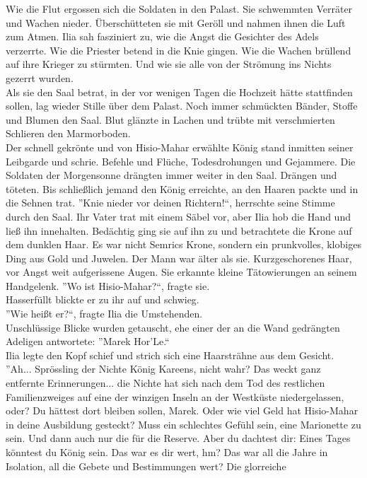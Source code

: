 Wie die Flut ergossen sich die Soldaten in den Palast. Sie schwemmten Verräter und Wachen nieder. 
Überschütteten sie mit Geröll und nahmen ihnen die Luft zum Atmen. Ilia sah fasziniert zu, wie die 
Angst die Gesichter des Adels verzerrte. Wie die Priester betend in die Knie gingen. Wie die Wachen 
brüllend auf ihre Krieger zu stürmten. Und wie sie alle von der Strömung ins Nichts gezerrt 
wurden.\\
Als sie den Saal betrat, in der vor wenigen Tagen die Hochzeit hätte stattfinden sollen, lag wieder 
Stille über dem Palast. Noch immer schmückten Bänder, Stoffe und Blumen den Saal. Blut glänzte in 
Lachen und trübte mit verschmierten Schlieren den Marmorboden.\\
Der schnell gekrönte und von Hisio-Mahar erwählte König stand inmitten seiner Leibgarde und 
schrie. Befehle und Flüche, Todesdrohungen und Gejammere. Die Soldaten der Morgensonne drängten 
immer weiter in den Saal. Drängen und töteten. Bis schließlich jemand den König erreichte, an 
den Haaren packte und in die Sehnen trat. ''Knie nieder vor deinen Richtern!``, herrschte seine 
Stimme durch den Saal. Ihr Vater trat mit einem Säbel vor, aber Ilia hob die Hand und ließ ihn 
innehalten. Bedächtig ging sie auf ihn zu und betrachtete die Krone auf dem dunklen Haar. Es war 
nicht Semrics Krone, sondern ein prunkvolles, klobiges Ding aus Gold und Juwelen. Der Mann 
war älter als sie. Kurzgeschorenes Haar, vor Angst weit aufgerissene Augen. Sie erkannte kleine 
Tätowierungen an seinem Handgelenk. ''Wo ist Hisio-Mahar?``, fragte sie.\\
Hasserfüllt blickte er zu ihr auf und schwieg.\\
''Wie heißt er?``, fragte Ilia die Umstehenden.\\
Unschlüssige Blicke wurden getauscht, ehe einer der an die Wand gedrängten Adeligen antwortete: 
''Marek Hor'Le.``\\
Ilia legte den Kopf schief und strich sich eine Haarsträhne aus dem Gesicht. ''Ah... Sprössling der 
Nichte König Kareens, nicht wahr? Das weckt ganz entfernte Erinnerungen... die Nichte hat sich nach 
dem Tod des restlichen Familienzweiges auf eine der winzigen Inseln an der Westküste 
niedergelassen, oder? Du hättest dort bleiben sollen, Marek. Oder wie viel Geld hat Hisio-Mahar in 
deine Ausbildung gesteckt? Muss ein schlechtes Gefühl sein, eine Marionette zu sein. Und dann auch 
nur die für die Reserve. Aber du dachtest dir: Eines Tages könntest du König sein. Das war es dir 
wert, hm? Das war all die Jahre in Isolation, all die Gebete und Bestimmungen wert? Die glorreiche 
